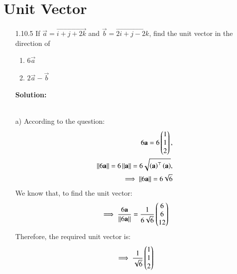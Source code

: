 \documentclass[journal]{IEEEtran}
\begin{document}
\section{Unit Vector}
\begin{enumerate}
\item [1.10.5] If $\vec{a} =\vec{i+j+2k}$ and $\vec{b} = \vec{2i+j-2k}$, find the unit vector in the direction of
\begin{enumerate}
    \item $6\vec{a}$
    \item $2\vec{a}-\vec{b}$
\end{enumerate}
\textbf{Solution:}
\begin{table}[h!]    
      \centering
      
      \caption{}
    \end{table}\\
a) According to the question:
\begin{align}
    6\mathbf{a} = 6\begin{pmatrix}1\\1\\2\end{pmatrix},\\
    \left\vert\left\vert6\mathbf{a}\right\vert\right\vert = 6\left\vert\left\vert\mathbf{a}\right\vert\right\vert = 6\sqrt{{\left(\mathbf{a}\right)^\top\left(\mathbf{a}\right)}},\\
    \implies \left\vert\left\vert6\mathbf{a}\right\vert\right\vert = 6\sqrt{6}
\end{align}
We know that, to find the unit vector:
\begin{align}
    \implies \frac{6\mathbf{a}}{\left\vert\left\vert6\mathbf{a}\right\vert\right\vert} = \frac{1}{6\sqrt{6}}\begin{pmatrix}6\\6\\12\end{pmatrix}
\end{align}
Therefore, the required unit vector is:
\begin{align}
    \implies \frac{1}{\sqrt{6}}\begin{pmatrix}1\\1\\2\end{pmatrix}
\end{align}


\end{enumerate}
\end{document}
